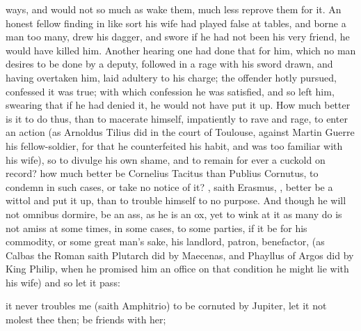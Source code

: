 ways, and would not so much as wake them, much less reprove them for
it. An honest fellow finding in like sort his wife had played
false at tables, and borne a man too many, drew his dagger, and swore
if he had not been his very friend, he would have killed him. Another
hearing one had done that for him, which no man desires to be done by a
deputy, followed in a rage with his sword drawn, and having overtaken
him, laid adultery to his charge; the offender hotly pursued, confessed
it was true; with which confession he was satisfied, and so left him,
swearing that if he had denied it, he would not have put it up. How
much better is it to do thus, than to macerate himself, impatiently to
rave and rage, to enter an action (as Arnoldus Tilius did in the court
of Toulouse, against Martin Guerre his fellow-soldier, for that he
counterfeited his habit, and was too familiar with his wife), so to
divulge his own shame, and to remain for ever a cuckold on record? how
much better be Cornelius Tacitus than Publius Cornutus, to condemn in
such cases, or take no notice of it? , saith Erasmus, , better be a wittol and put it up,
than to trouble himself to no purpose. And though he will not omnibus
dormire, be an ass, as he is an ox, yet to wink at it as many do is not
amiss at some times, in some cases, to some parties, if it be for his
commodity, or some great man's sake, his landlord, patron, benefactor,
(as Calbas the Roman saith Plutarch did by Maecenas, and Phayllus
of Argos did by King Philip, when he promised him an office on that
condition he might lie with his wife) and so let it pass:


it never troubles me (saith Amphitrio) to be cornuted by Jupiter, let
it not molest thee then; be friends with her;

%

